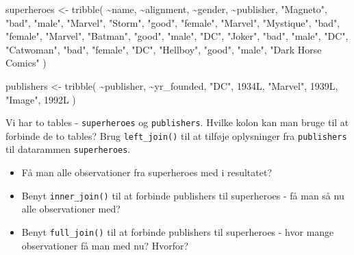 \documentclass[
]{book}
\newenvironment{Shaded}{\begin{snugshade}}{\end{snugshade}}
\newcommand{\FunctionTok}[1]{\textcolor[rgb]{0.00,0.00,0.00}{#1}}
\newcommand{\NormalTok}[1]{#1}
\newcommand{\OtherTok}[1]{\textcolor[rgb]{0.56,0.35,0.01}{#1}}
\newcommand{\SpecialCharTok}[1]{\textcolor[rgb]{0.00,0.00,0.00}{#1}}
\newcommand{\StringTok}[1]{\textcolor[rgb]{0.31,0.60,0.02}{#1}}
\providecommand{\tightlist}{%
  \setlength{\itemsep}{0pt}\setlength{\parskip}{0pt}}
\begin{document}
\begin{Shaded}
\begin{Highlighting}[]
\NormalTok{superheroes }\OtherTok{\textless{}{-}} \FunctionTok{tribble}\NormalTok{(}
       \SpecialCharTok{\textasciitilde{}}\NormalTok{name, }\SpecialCharTok{\textasciitilde{}}\NormalTok{alignment,  }\SpecialCharTok{\textasciitilde{}}\NormalTok{gender,          }\SpecialCharTok{\textasciitilde{}}\NormalTok{publisher,}
   \StringTok{"Magneto"}\NormalTok{,      }\StringTok{"bad"}\NormalTok{,   }\StringTok{"male"}\NormalTok{,            }\StringTok{"Marvel"}\NormalTok{,}
     \StringTok{"Storm"}\NormalTok{,     }\StringTok{"good"}\NormalTok{, }\StringTok{"female"}\NormalTok{,            }\StringTok{"Marvel"}\NormalTok{,}
  \StringTok{"Mystique"}\NormalTok{,      }\StringTok{"bad"}\NormalTok{, }\StringTok{"female"}\NormalTok{,            }\StringTok{"Marvel"}\NormalTok{,}
    \StringTok{"Batman"}\NormalTok{,     }\StringTok{"good"}\NormalTok{,   }\StringTok{"male"}\NormalTok{,                }\StringTok{"DC"}\NormalTok{,}
     \StringTok{"Joker"}\NormalTok{,      }\StringTok{"bad"}\NormalTok{,   }\StringTok{"male"}\NormalTok{,                }\StringTok{"DC"}\NormalTok{,}
  \StringTok{"Catwoman"}\NormalTok{,      }\StringTok{"bad"}\NormalTok{, }\StringTok{"female"}\NormalTok{,                }\StringTok{"DC"}\NormalTok{,}
   \StringTok{"Hellboy"}\NormalTok{,     }\StringTok{"good"}\NormalTok{,   }\StringTok{"male"}\NormalTok{, }\StringTok{"Dark Horse Comics"}
\NormalTok{  )}

\NormalTok{publishers }\OtherTok{\textless{}{-}} \FunctionTok{tribble}\NormalTok{(}
  \SpecialCharTok{\textasciitilde{}}\NormalTok{publisher, }\SpecialCharTok{\textasciitilde{}}\NormalTok{yr\_founded,}
        \StringTok{"DC"}\NormalTok{,       1934L,}
    \StringTok{"Marvel"}\NormalTok{,       1939L,}
     \StringTok{"Image"}\NormalTok{,       1992L}
\NormalTok{  )}
\end{Highlighting}
\end{Shaded}

Vi har to tables - \texttt{superheroes} og \texttt{publishers}. Hvilke kolon kan man bruge til at forbinde de to tables? Brug \texttt{left\_join()} til at tilføje oplysninger fra \texttt{publishers} til datarammen \texttt{superheroes}.

\begin{itemize}
\tightlist
\item
  Få man alle observationer fra superheroes med i resultatet?
\item
  Benyt \texttt{inner\_join()} til at forbinde publishers til superheroes - få man så nu alle observationer med?
\item
  Benyt \texttt{full\_join()} til at forbinde publishers til superheroes - hvor mange observationer få man med nu? Hvorfor?
\end{itemize}
\end{document}

